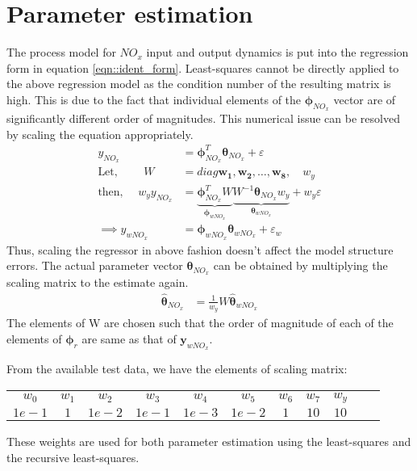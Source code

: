 \newpage
\section{Parameter estimation}
The process model for $NO_x$ input and output dynamics is put into the regression form in equation
\ref{eqn::ident_form}. Least-squares cannot be directly applied to the above regression model as the condition number of
the resulting matrix is high. This is due to the fact that individual elements of the $\pmb \phi_{NO_x}$ vector are of
significantly different order of magnitudes. This numerical issue can be resolved by scaling the equation appropriately.
\begin{align*}
        y_{NO_x} &= \pmb \phi_{NO_x}^T \pmb \theta_{NO_x} + \varepsilon\\
        \text{Let, } \qquad W &= diag \bm{w_1, w_2, \hdots, w_8}, \quad w_y \\
        \text{then, } \quad w_y y_{NO_x} &= \underbrace{\pmb \phi_{NO_x}^T  W}_{\pmb \phi_{wNO_x}}
                        \underbrace{ W^{-1} \pmb \theta_{NO_x} w_y }_{\pmb \theta_{wNO_x}} + w_y \varepsilon\\
        \implies y_{w NO_x} &= \pmb \phi_{wNO_x} \pmb \theta_{w NO_x} + \varepsilon_w
\end{align*}
Thus, scaling the regressor in above fashion doesn't affect the model structure errors. The actual parameter vector $\pmb \theta_{NO_x}$ can be obtained by multiplying the scaling matrix to the estimate again.
\begin{align*}
        \hat{\pmb \theta}_{NO_x} &=  \frac{1}{w_y} W \hat{\pmb \theta}_{wNO_x}
\end{align*}
The elements of W are chosen such that the order of magnitude of each of the elements of $\pmb \phi_r$ are same as that of $\pmb y_{w NO_x}$.

From the available test data, we have the elements of scaling matrix:
\begin{table}[H]
        \centering
        \begin{tabular}{c c c c c c c c c c c}
                $w_0$  & $w_1$  & $w_2$     & $w_3$     & $w_4$     & $w_5$     & $w_6$  & $w_7$ & $w_y$\\
                $1e-1$ & $1$    & $1e-2$    & $1e-1$    & $1e-3$    & $1e-2$    & $1$    & $10$  & $10$
        \end{tabular}
\end{table}

These weights are used for both parameter estimation using the least-squares and the recursive least-squares.

